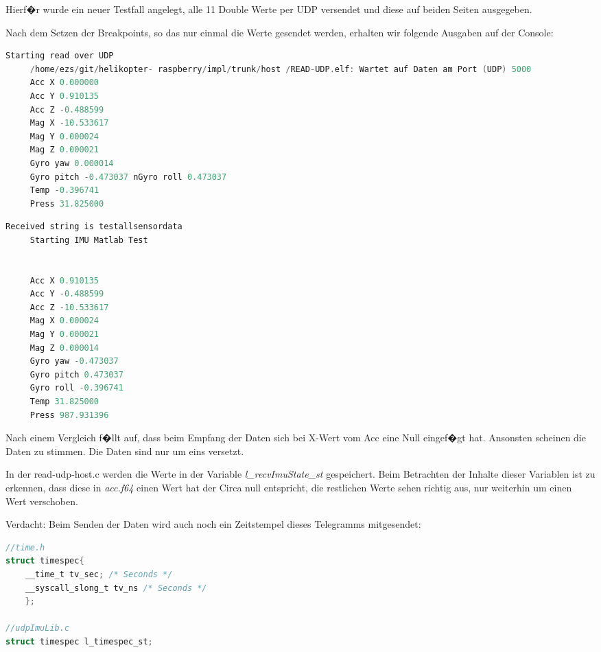 Hierf�r wurde ein neuer Testfall angelegt, alle 11 Double Werte per UDP versendet und diese auf beiden Seiten ausgegeben. 

Nach dem Setzen der Breakpoints, so das nur einmal die Werte gesendet werden, erhalten wir folgende Ausgaben auf der Console:

\begin{multicols}{2}
	 \begin{lstlisting}[language=C++]
	 Starting read over UDP
	 /home/ezs/git/helikopter- raspberry/impl/trunk/host /READ-UDP.elf: Wartet auf Daten am Port (UDP) 5000
	 Acc X 0.000000 
	 Acc Y 0.910135 
	 Acc Z -0.488599 
	 Mag X -10.533617 
	 Mag Y 0.000024 
	 Mag Z 0.000021 
	 Gyro yaw 0.000014 
	 Gyro pitch -0.473037 nGyro roll 0.473037 
	 Temp -0.396741 
	 Press 31.825000 
	 \end{lstlisting}
	
	\columnbreak
	
	 \begin{lstlisting}[language=C++]
	 Received string is testallsensordata 
	 Starting IMU Matlab Test
	 
	 
	 Acc X 0.910135 
	 Acc Y -0.488599 
	 Acc Z -10.533617 
	 Mag X 0.000024 
	 Mag Y 0.000021 
	 Mag Z 0.000014 
	 Gyro yaw -0.473037 
	 Gyro pitch 0.473037 
	 Gyro roll -0.396741 
	 Temp 31.825000 
	 Press 987.931396 
	 \end{lstlisting}
\end{multicols}
 

Nach einem Vergleich f�llt auf, dass beim Empfang der Daten sich bei X-Wert vom Acc eine Null eingef�gt hat. Ansonsten scheinen die Daten zu stimmen. Die Daten sind nur um eins versetzt.

In der read-udp-host.c werden die Werte in der Variable \emph{l\_recvImuState\_st} gespeichert. Beim Betrachten der Inhalte dieser Variablen ist zu erkennen, dass diese in \emph{acc.f64} einen Wert hat der Circa null entspricht, die restlichen Werte sehen richtig aus, nur weiterhin um einen Wert verschoben.

Verdacht: Beim Senden der Daten wird auch noch ein Zeitstempel dieses Telegramms mitgesendet: 
\begin{lstlisting}[language=C++]
//time.h
struct timespec{
	__time_t tv_sec; /* Seconds */
	__syscall_slong_t tv_ns	/* Seconds */
	};

//udpImuLib.c
struct timespec l_timespec_st;

\end{lstlisting}

